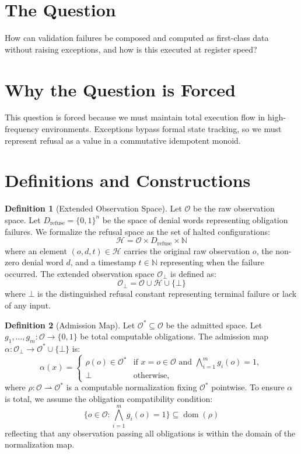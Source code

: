 \documentclass[11pt,oneside]{book}
\theoremstyle{definition}
\newtheorem{definition}{Definition}[chapter]
\theoremstyle{plain}
\theoremstyle{remark}
\newcommand{\Obs}{\mathcal{O}}                 %
\newcommand{\Obsbot}{\Obs_{\bot}}             %
\newcommand{\adm}{\alpha}                      %
\newcommand{\Rfsl}{\bot}                        %
\begin{document}
\section{The Question}
How can validation failures be composed and computed as first-class data without raising exceptions, and how is this executed at register speed? %

\section{Why the Question is Forced}
This question is forced because we must maintain total execution flow in high-frequency environments. %
Exceptions bypass formal state tracking, so we must represent refusal as a value in a commutative idempotent monoid. %

\section{Definitions and Constructions}

\begin{definition}[Extended Observation Space]\label{def:extended_obs}
Let $\Obs$ be the raw observation space. %
Let $D_{\text{refuse}} = \{0,1\}^n$ be the space of denial words representing obligation failures. %
We formalize the refusal space as the set of halted configurations:
\[
\mathcal{H} = \Obs \times D_{\text{refuse}} \times \mathbb{N}
\]
where an element $(o, d, t) \in \mathcal{H}$ carries the original raw observation $o$, the non-zero denial word $d$, and a timestamp $t \in \mathbb{N}$ representing when the failure occurred. %
The extended observation space $\Obsbot$ is defined as:
\[
\Obsbot = \Obs \cup \mathcal{H} \cup \{\Rfsl\}
\]
where $\Rfsl$ is the distinguished refusal constant representing terminal failure or lack of any input. %
\end{definition}

\begin{definition}[Admission Map]\label{def:admission_map}
Let $\Obs^* \subseteq \Obs$ be the admitted space. %
Let $g_1, \dots, g_m: \Obs \to \{0,1\}$ be total computable obligations. %
The admission map $\adm: \Obsbot \to \Obs^* \cup \{\Rfsl\}$ is:
\[
\adm(x) = \begin{cases}
\rho(o) \in \Obs^* & \text{if } x = o \in \Obs \text{ and } \bigwedge_{i=1}^m g_i(o) = 1, \\
\Rfsl & \text{otherwise},
\end{cases}
\]
where $\rho: \Obs \rightharpoonup \Obs^*$ is a computable normalization fixing $\Obs^*$ pointwise. %
To ensure $\adm$ is total, we assume the obligation compatibility condition:
\[
\{o \in \Obs : \bigwedge_{i=1}^m g_i(o) = 1\} \subseteq \operatorname{dom}(\rho)
\]
reflecting that any observation passing all obligations is within the domain of the normalization map. %
\end{definition}
\end{document}
